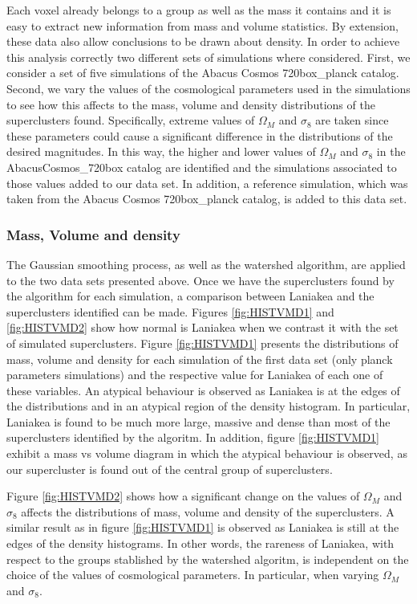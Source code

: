 \documentclass[usenatbib]{mnras}
\begin{document}
Each voxel already belongs to a group as well as the mass it contains and it is easy to extract new information from mass and volume statistics. By extension, these data also allow conclusions to be drawn about density. In order to achieve this analysis correctly two different sets of simulations where considered. First, we consider a set of five simulations of the Abacus Cosmos 720box\_planck catalog. Second, we vary the values of the cosmological parameters used in the simulations to see how this affects to the mass, volume and density distributions of the superclusters found. Specifically, extreme values of $\Omega_M$ and $\sigma_8$ are taken since these parameters could cause a significant difference in the distributions of the desired magnitudes. In this way, the higher and lower values of $\Omega_M$ and $\sigma_8$ in the AbacusCosmos\_720box catalog are identified and the simulations associated to those values added to our data set. In addition, a reference simulation, which was taken from the Abacus Cosmos 720box\_planck catalog, is added to this data set.

\subsubsection{Mass, Volume and density}

The Gaussian smoothing process, as well as the watershed algorithm, are applied to the two data sets presented above.  Once we have the superclusters found by the algorithm for each simulation, a comparison between Laniakea and the superclusters identified can be made. Figures \ref{fig:HISTVMD1} and \ref{fig:HISTVMD2} show how normal is Laniakea when we contrast it with the set of simulated superclusters. 
Figure \ref{fig:HISTVMD1} presents the distributions of mass, volume and density for each simulation of the first data set (only planck parameters simulations) and the respective value for Laniakea of each one of these variables. An atypical behaviour is observed as Laniakea is at the edges of the distributions and in an atypical region of the density histogram. In particular, Laniakea is found to be much more large, massive and dense than most of the superclusters identified by the algoritm. In addition, figure \ref{fig:HISTVMD1} exhibit a mass vs volume diagram in which the atypical behaviour is observed, as our supercluster is found out of the central group of superclusters.

Figure \ref{fig:HISTVMD2} shows how a significant change on the values of $\Omega_M$ and $\sigma_8$ affects the distributions of mass, volume and density of the superclusters. A similar result as in figure \ref{fig:HISTVMD1} is observed as Laniakea is still at the edges of the density histograms. In other words, the rareness of Laniakea, with respect to the groups stablished by the watershed algoritm, is independent on the choice of the values of cosmological parameters. In particular, when varying $\Omega_M$ and $\sigma_8$.
\end{document}
